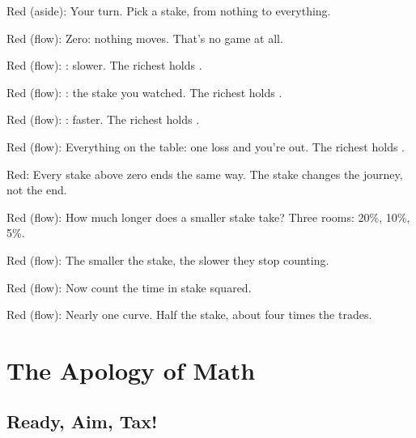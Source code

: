 
Red (aside): Your turn.
Pick a stake, from nothing to everything.

Red (flow): Zero: nothing moves.
That's no game at all.

Red (flow): : slower.
The richest holds .

Red (flow): : the stake you watched.
The richest holds .

Red (flow): : faster.
The richest holds .

Red (flow): Everything on the table:
one loss and you're out. The richest holds .

Red: Every \gls{stake} above zero ends the same way.
The stake changes the journey, not the end.

Red (flow): How much longer does a smaller stake take?
Three rooms: 20\%, 10\%, 5\%.

Red (flow): The smaller the stake,
the slower they stop counting.

Red (flow): Now count the time in stake squared.

Red (flow): Nearly one curve.
Half the stake, about four times the trades.

\chapter{The Apology of Math}\label{chapter:apology-of-math}

\section{Ready, Aim, Tax!}\label{index:ready-aim-tax}

